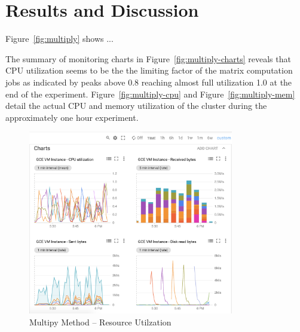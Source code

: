\documentclass{prog_report}
\begin{document}
\section{Results and Discussion}


Figure~\ref{fig:multiply} shows ...


The summary of monitoring charts in Figure~\ref{fig:multiply-charts} reveals that CPU utilization seems to be the the limiting factor of the matrix computation jobs as indicated by peaks above 0.8 reaching almost full utilization 1.0 at the end of the experiment.
Figure~\ref{fig:multiply-cpu} and Figure~\ref{fig:multiply-mem} detail the actual CPU and memory utilization of the cluster during the approximately one hour experiment.

\begin{figure}[h]
    \centering
    \includegraphics[width=0.8\textwidth]{img/multiply-resources}
    \caption{Multipy Method – Resource Utilzation}
    \label{fig:multiply-resources}
\end{figure}
\end{document}
